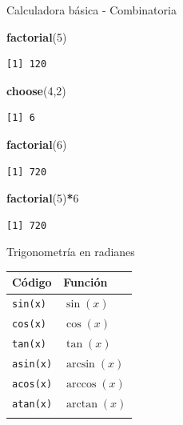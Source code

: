 \documentclass[
  ignorenonframetext,
]{beamer}
\newenvironment{Shaded}{\begin{snugshade}}{\end{snugshade}}
\newcommand{\DecValTok}[1]{\textcolor[rgb]{0.00,0.00,0.81}{#1}}
\newcommand{\FunctionTok}[1]{\textcolor[rgb]{0.13,0.29,0.53}{\textbf{#1}}}
\newcommand{\NormalTok}[1]{#1}
\newcommand{\SpecialCharTok}[1]{\textcolor[rgb]{0.81,0.36,0.00}{\textbf{#1}}}
\begin{document}
\begin{frame}[fragile]{Calculadora básica - Combinatoria}
\label{calculadora-buxe1sica---combinatoria}
\begin{Shaded}
\begin{Highlighting}[]
\FunctionTok{factorial}\NormalTok{(}\DecValTok{5}\NormalTok{)}
\end{Highlighting}
\end{Shaded}

\begin{verbatim}
[1] 120
\end{verbatim}

\begin{Shaded}
\begin{Highlighting}[]
\FunctionTok{choose}\NormalTok{(}\DecValTok{4}\NormalTok{,}\DecValTok{2}\NormalTok{)}
\end{Highlighting}
\end{Shaded}

\begin{verbatim}
[1] 6
\end{verbatim}

\begin{Shaded}
\begin{Highlighting}[]
\FunctionTok{factorial}\NormalTok{(}\DecValTok{6}\NormalTok{)}
\end{Highlighting}
\end{Shaded}

\begin{verbatim}
[1] 720
\end{verbatim}

\begin{Shaded}
\begin{Highlighting}[]
\FunctionTok{factorial}\NormalTok{(}\DecValTok{5}\NormalTok{)}\SpecialCharTok{*}\DecValTok{6}
\end{Highlighting}
\end{Shaded}

\begin{verbatim}
[1] 720
\end{verbatim}
\end{frame}

\begin{frame}[fragile]{Trigonometría en radianes}
\label{trigonometruxeda-en-radianes}
\begin{longtable}[]{@{}ll@{}}
\toprule\noalign{}
Código & Función \\
\midrule\noalign{}
\endhead
\texttt{sin(x)} & \(\sin(x)\) \\
\texttt{cos(x)} & \(\cos(x)\) \\
\texttt{tan(x)} & \(\tan(x)\) \\
\texttt{asin(x)} & \(\arcsin(x)\) \\
\texttt{acos(x)} & \(\arccos(x)\) \\
\texttt{atan(x)} & \(\arctan(x)\) \\
\bottomrule\noalign{}
\end{longtable}
\end{frame}
\end{document}
